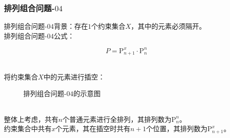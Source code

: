 \documentclass[UTF8]{ctexart}
\newcommand{\rnum}[1]{\uppercase\expandafter{\romannumeral #1\relax}}
\begin{document}
\subsubsection{排列组合问题\rnum{1}-$04$}
    排列组合问题\rnum{1}-$04$背景：存在$1$个约束集合$X$，其中的元素必须隔开。\\[3mm]
    排列组合问题\rnum{1}-$04$公式：
    \begin{large}
        \begin{equation*}
           P=\mathrm{P}_{n+1}^{x}\cdot\mathrm{P}_n^n
        \end{equation*}
    \end{large}\\ 
    将约束集合$X$中的元素进行插空：
    \begin{figure}[h]
        \begin{center}
            \caption{排列组合问题\rnum{1}-$04$的示意图}
        \end{center}
    \end{figure}\\
    整体上考虑，共有$n$个普通元素进行全排列，其排列数为$\mathrm{P}_n^n$。\\[3mm]
    约束集合中共有$x$个元素，其在插空时共有$n+1$个位置，其排列数为$\mathrm{P}_{n+1}^{x}$。\\
\end{document}
